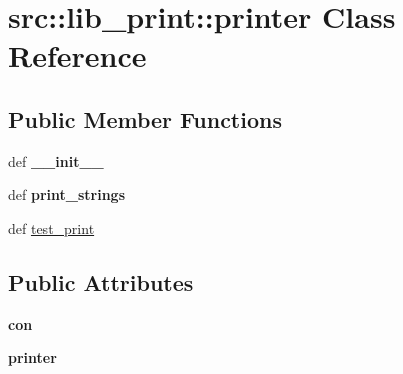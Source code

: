\hypertarget{classsrc_1_1lib__print_1_1printer}{
\section{src::lib\_\-print::printer Class Reference}
\label{classsrc_1_1lib__print_1_1printer}
}
\subsection*{Public Member Functions}
\begin{DoxyCompactItemize}
\item 
\hypertarget{classsrc_1_1lib__print_1_1printer_a4eef4387430fb80ed9f81c62f4192165}{
def {\bfseries \_\-\_\-init\_\-\_\-}}
\label{classsrc_1_1lib__print_1_1printer_a4eef4387430fb80ed9f81c62f4192165}

\item 
\hypertarget{classsrc_1_1lib__print_1_1printer_a60447fd6ea3237e98e288c5c1226331e}{
def {\bfseries print\_\-strings}}
\label{classsrc_1_1lib__print_1_1printer_a60447fd6ea3237e98e288c5c1226331e}

\item 
def \hyperlink{classsrc_1_1lib__print_1_1printer_a028f752270a2bb2aeea37c0fa588fa76}{test\_\-print}
\end{DoxyCompactItemize}
\subsection*{Public Attributes}
\begin{DoxyCompactItemize}
\item 
\hypertarget{classsrc_1_1lib__print_1_1printer_a58bd6ceafaa0a775c75b55fa20af123c}{
{\bfseries con}}
\label{classsrc_1_1lib__print_1_1printer_a58bd6ceafaa0a775c75b55fa20af123c}

\item 
\hypertarget{classsrc_1_1lib__print_1_1printer_a708141fa6cda4fd30522f6577f0a4d0d}{
{\bfseries printer}}
\label{classsrc_1_1lib__print_1_1printer_a708141fa6cda4fd30522f6577f0a4d0d}

\end{DoxyCompactItemize}


